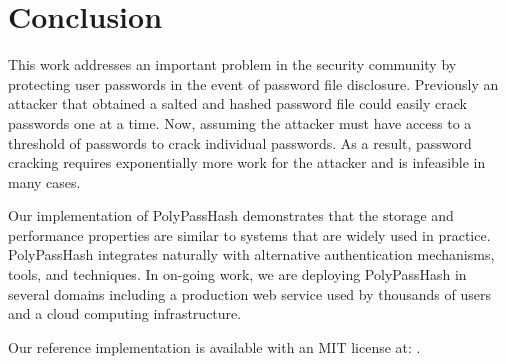 \section{Conclusion}
\label{sec-conclusion}

This work addresses an important problem in the security community by 
protecting user passwords in the event of password file disclosure.   
Previously an attacker that obtained a salted and hashed password file could 
easily crack passwords one at a time.   Now,
assuming the attacker must have access to a threshold of passwords to 
crack individual passwords.  As a result,
password cracking requires exponentially more work for the attacker and
is infeasible in many cases.

Our implementation of PolyPassHash demonstrates that the storage and
performance properties are similar to systems that are widely used in practice.
PolyPassHash integrates naturally with alternative authentication 
mechanisms, tools, and techniques.
In on-going work, we are deploying PolyPassHash %
in several domains including a production web service used by thousands
of users and a cloud computing infrastructure.   

Our reference implementation is available with an MIT license at:
\showurlx.

%
%
%

